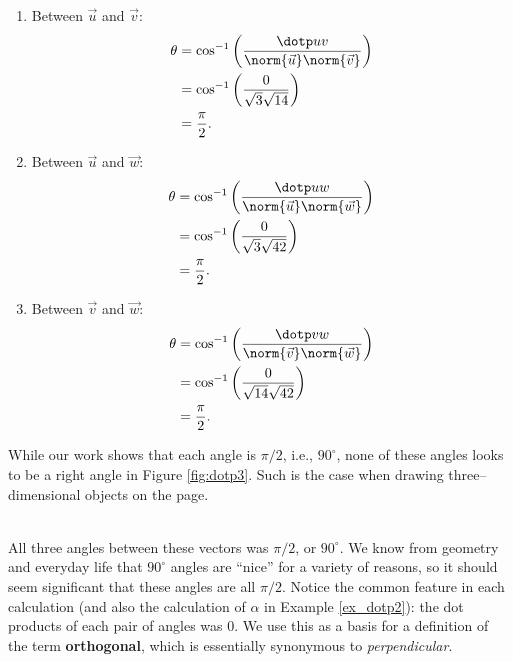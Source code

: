 %
{\begin{enumerate}
	\item Between $\vec u$ and $\vec v$:
	\begin{align*}
	\theta &= \cos^{-1}\left(\frac{\dotp uv}{\norm{\vec u}\norm{\vec v}}\right)\\
					&= \cos^{-1}\left(\frac{0}{\sqrt{3}\sqrt{14}}\right)\\
					&= \frac{\pi}2.
	\end{align*}
	\item	Between $\vec u$ and $\vec w$:
	\begin{align*}
	\theta &= \cos^{-1}\left(\frac{\dotp uw}{\norm{\vec u}\norm{\vec w}}\right)\\
					&= \cos^{-1}\left(\frac{0}{\sqrt{3}\sqrt{42}}\right)\\
					&= \frac{\pi}2.
	\end{align*}
	\item	Between $\vec v$ and $\vec w$:
	\begin{align*}
	\theta &= \cos^{-1}\left(\frac{\dotp vw}{\norm{\vec v}\norm{\vec w}}\right)\\
					&= \cos^{-1}\left(\frac{0}{\sqrt{14}\sqrt{42}}\right)\\
					&= \frac{\pi}2.
	\end{align*}
\end{enumerate}
While our work shows that each angle is $\pi/2$, i.e.,  $90^\circ$, none of these angles looks to be a right angle in Figure \ref{fig:dotp3}. Such is the case when drawing three--dimensional objects on the page.
}\\

All three angles between these vectors was $\pi/2$, or $90^\circ$. We know from geometry and everyday life that $90^\circ$ angles are ``nice'' for a variety of reasons, so it should seem significant that these angles are all $\pi/2$. Notice the common feature in each calculation (and also the calculation of $\alpha$ in Example \ref{ex_dotp2}): the dot products of each pair of angles was 0. We use this as a basis for a definition of the term \textbf{orthogonal}, which is essentially synonymous to \textit{perpendicular}.

